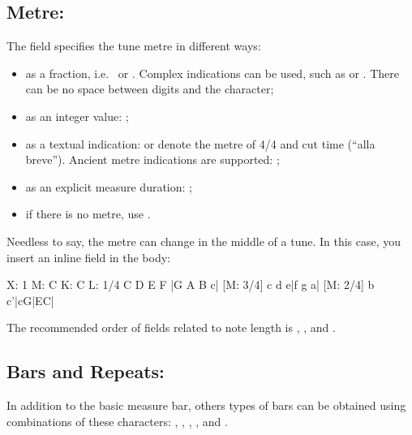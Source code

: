 \documentclass[a4paper,fullpage,12pt]{book}
\begin{document}

\subsection{Metre: }
\label{sec:metre}

The  field specifies the tune metre in different ways:

\begin{itemize}
  
  \item as a fraction, i.e.\  or . Complex
  indications can be used, such as  or
  . There can be no space between digits and
  the \car{+} character;
  
  \item as an integer value: ;
  
  \item as a textual indication:  or  denote the
  metre of 4/4 and cut time (``alla breve''). Ancient metre
  indications are supported:   
  ;

  \item as an explicit measure duration: ;

  \item if there is no metre, use .
  
\end{itemize}

Needless to say, the metre can change in the middle of a tune. In this
case, you insert an inline  field in the body:

\begin{abcsource}
X: 1
M: C
K: C
L: 1/4
C D E F |G A B c| [M: 3/4] c d e|f g a| [M: 2/4] b c'|cG|EC|
\end{abcsource}


The recommended order of fields related to note length is ,
, and . %


\subsection{Bars and Repeats: \icmd{\textbar{} / : [ ]}}

In addition to the basic measure bar, others types of bars can be
obtained using combinations of these characters: \car{\textbar{}},
, \car{[}, \car{]}, and \car{:}.
\end{document}
